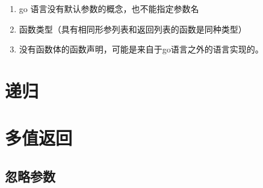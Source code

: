 \begin{enumerate}
\item
  go 语言没有默认参数的概念，也不能指定参数名

\begin{Shaded}
\begin{Highlighting}[]
\OperatorTok{=}\OperatorTok{=}\NormalTok{):}

\OperatorTok{=}\NormalTok{)}
\end{Highlighting}
\end{Shaded}
\item
  函数类型（具有相同形参列表和返回列表的函数是同种类型）
\item
  没有函数体的函数声明，可能是来自于go语言之外的语言实现的。

\begin{Shaded}
\begin{Highlighting}[]
\NormalTok{) } 
\end{Highlighting}
\end{Shaded}
\end{enumerate}

\hypertarget{ux9012ux5f52}{%
\section{递归}\label{ux9012ux5f52}}

\hypertarget{ux591aux503cux8fd4ux56de}{%
\section{多值返回}\label{ux591aux503cux8fd4ux56de}}

\hypertarget{ux5ffdux7565ux53c2ux6570}{%
\subsection{忽略参数}\label{ux5ffdux7565ux53c2ux6570}}

\begin{Shaded}
\begin{Highlighting}[]
\end{Highlighting}
\end{Shaded}

